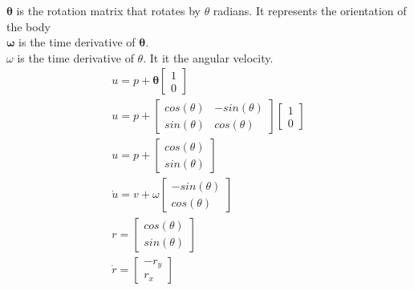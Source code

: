 \documentclass{article}
\begin{document}
$\boldsymbol\theta$ is the rotation matrix that rotates by $\theta$ radians. It represents the orientation of the body \\
$\boldsymbol\omega$ is the time derivative of $\boldsymbol\theta$. \\
$\omega$ is the time derivative of $\theta$. It it the angular velocity.
\begin{gather}
u = p + \boldsymbol\theta \begin{bmatrix} 1 \\ 0 \end{bmatrix} \\
u = p + 
\begin{bmatrix}
    cos(\theta) & -sin(\theta) \\ 
    sin(\theta) & cos(\theta)
\end{bmatrix}
\begin{bmatrix} 1 \\ 0 \end{bmatrix} \\
u = p + \begin{bmatrix} cos(\theta) \\ sin(\theta) \end{bmatrix} \\
\dot u = v + \omega \begin{bmatrix} -sin(\theta) \\ cos(\theta) \end{bmatrix} \\
r = \begin{bmatrix} cos(\theta) \\ sin(\theta) \end{bmatrix} \\ 
\dot r = \begin{bmatrix} -r_y \\ r_x \end{bmatrix}
\end{gather}
\end{document}
